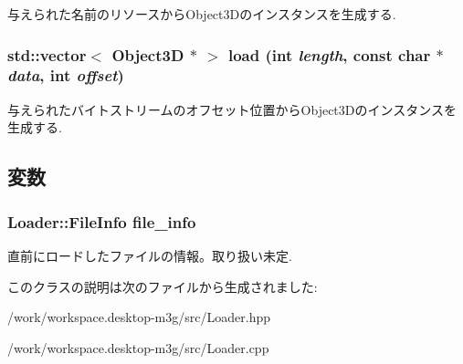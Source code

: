 与えられた名前のリソースからObject3Dのインスタンスを生成する. \hypertarget{classm3g_1_1Loader_226696271b917ad797016959bb7adbe1}{
\subsubsection[{load}]{\setlength{\rightskip}{0pt plus 5cm}std::vector$<$ {\bf Object3D} $\ast$ $>$ load (int {\em length}, \/  const char $\ast$ {\em data}, \/  int {\em offset})}}
\label{classm3g_1_1Loader_226696271b917ad797016959bb7adbe1}


与えられたバイトストリームのオフセット位置からObject3Dのインスタンスを生成する. 

\subsection{変数}
\hypertarget{classm3g_1_1Loader_b5b2e875f7353dca9dad61c686bccf92}{
\subsubsection[{file\_\-info}]{\setlength{\rightskip}{0pt plus 5cm}Loader::FileInfo {\bf file\_\-info}}}
\label{classm3g_1_1Loader_b5b2e875f7353dca9dad61c686bccf92}


直前にロードしたファイルの情報。取り扱い未定. 

このクラスの説明は次のファイルから生成されました:\begin{CompactItemize}
\item 
/work/workspace.desktop-m3g/src/Loader.hpp\item 
/work/workspace.desktop-m3g/src/Loader.cpp\end{CompactItemize}
